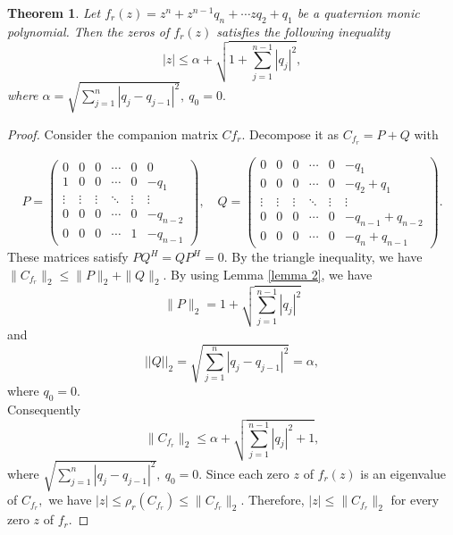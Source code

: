 \documentclass [12pt]{article}
\newtheorem{theorem}{Theorem}
\begin{document}
\begin{theorem}
Let $f_r(z) = z^n  + z^{n-1} q_{n} + \cdots zq_{2}+ q_1 $ be a quaternion monic polynomial. Then the zeros of $f_r(z)$ satisfies the following inequality
\[
|z| \leq \alpha + \sqrt{1+\sum_{j=1}^{n-1} |q_j|^2 },
\] where $\alpha=\sqrt{\sum_{j=1}^{n} |q_j - q_{j-1}|^2}, ~q_{0}=0.$
\end{theorem}
\begin{proof} Consider the companion matrix $Cf_{r}$. Decompose it as $C_{f_r}=P+Q$ 
with

\[
P = \begin{pmatrix}
0 & 0 & 0 & \cdots & 0&0 \\
1 & 0 & 0 & \cdots &0& -q_{1} \\
\vdots & \vdots & \vdots & \ddots & \vdots &\vdots\\
0 & 0 & 0 & \cdots & 0&-q_{n-2} \\
0 & 0 & 0 & \cdots & 1&-q_{n-1}
\end{pmatrix}
,
\quad
Q = \begin{pmatrix}
0 & 0 & 0 & \cdots & 0&-q_{1} \\
0 & 0 & 0 & \cdots &0& -q_{2}+q_{1} \\
\vdots & \vdots & \vdots & \ddots & \vdots &\vdots\\
0 & 0 & 0 & \cdots & 0&-q_{n-1}+q_{n-2} \\
0 & 0 & 0 & \cdots & 0&-q_{n}+q_{n-1}
\end{pmatrix}.
\]These matrices satisfy $PQ^{H}=QP^{H}=0.$
 By the triangle inequality, we have  
 $\|C_{f_r}\|_{2
 }\le \|P\|_{2}+\|Q\|_{2}.$
 By using Lemma \ref{lemma 2}, we have \\
 $$\|P\|_{2}= 1+ \sqrt{\sum_{j=1}^{n-1} |q_j|^2 }$$ and  $$||Q||_{2}= \sqrt{\sum_{j=1}^{n} |q_j - q_{j-1}|^2}=\alpha,$$ where $q_{0}=0.$\\ Consequently
 $$\|C_{f_r}\|_{2}\le \alpha+ \sqrt{\sum_{j=1}^{n-1} |q_j|^2 + 1},$$ where $\sqrt{\sum_{j=1}^{n} |q_j - q_{j-1}|^2},~ q_{0}=0.$ Since each zero $z$ of $f_{r}(z)$ is an eigenvalue of $C_{f_r},$ we have $|z|\le \rho_{r}(C_{f_{r}})\le \|C_{f_{r}}\|_{2}.$ Therefore, 
 $|z|\le \|C_{f_r}\|_{2}$ for every zero $z$ of $f_r.$ 
\end{proof} 

    
\end{document}
